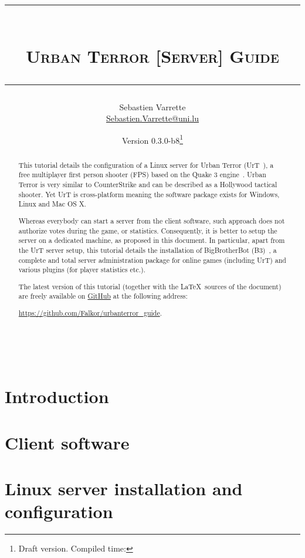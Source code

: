 \documentclass[11pt,twoside,a4paper]{article}
\title{
  {\rule{\textwidth}{1mm}}\\[1em]
  \textsc{Urban Terror [Server] Guide}\\[0.75em]
  {\rule{\textwidth}{1mm}}  
}
\author{Sebastien Varrette\\ {\small \url{Sebastien.Varrette@uni.lu}}}
\date{Version 0.3.0-b8\thanks{Draft version. Compiled time: \isodayandtime}}
\begin{document}
\maketitle

\begin{abstract}
  This tutorial details the configuration of a Linux server for Urban Terror
  (UrT~\cite{urt}), a free multiplayer first person shooter (FPS) based on the
  Quake 3 engine~\cite{ioq3}.  Urban Terror is very similar to CounterStrike and
  can be described as a Hollywood tactical shooter. Yet UrT is cross-platform
  meaning the software package exists for Windows, Linux and Mac OS X.

  Whereas everybody can start a server from the client software, such approach
  does not authorize votes during the game, or statistics.  Consequently, it is
  better to setup the server on a dedicated machine, as proposed in this document.
  In particular, apart from the UrT server setup, this tutorial details the
  installation of BigBrotherBot (B3)~\cite{b3}, a complete and total server
  administration package for online games (including UrT) and various plugins (for
  player statistics etc.).

  The latest version of this tutorial (together with the \LaTeX\ sources of the
  document) are freely available on
  \href{https://github.com/Falkor/urbanterror_guide}{GitHub} at the following
  address:
  \begin{center}
       \url{https://github.com/Falkor/urbanterror_guide}.
  \end{center}
\end{abstract}

\clearpage
~\vfill

\clearpage

\tableofcontents
\clearpage


\section{Introduction}
\label{sec:intro}



\section{Client software}
\label{sec:urt_client}



\section{Linux server installation and configuration}
\label{sec:urt_server}

\end{document}
